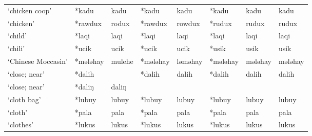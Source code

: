 \begin{landscape}
\begin{longtable}[c]{@{}p{3cm}<{\raggedright}p{2.75cm}<{\raggedright}p{2.75cm}<{\raggedright}p{2.75cm}<{\raggedright}p{2.75cm}<{\raggedright}p{2.75cm}<{\raggedright}p{2.75cm}<{\raggedright}p{2.75cm}<{\raggedright}@{}}
`chicken coop'                                       & *kadu        & kadu                          & *kadu          & kadu                       & *kadu            & kadu                     & kadu                              \\
`chicken'                                            & *rawdux      & rodux                         & *rawdux        & rowdux                     & *rudux           & rudux                    & rudux                             \\
`child'                                              & *laqi        & laqi                          & *laqi          & laqi                       & *laqi            & laqi                     & laqi                              \\
`chili'                                              & *ucik        & ucik                          & *ucik          & ucik                       & *usik            & usik                     & usik                              \\
`Chinese Moccasin'                                   & *mələhay     & mulehe                        & *mələhay       & ləməhay                    & *mələhay         & mələhay                  & mələhay                           \\
`close; near'                                        & *dalih       &                               & *dalih         & dalih                      & *dalih           & dalih                    & dalih                             \\
`close; near'                                        & *daliŋ       & daliŋ                         &                &                            &                  &                          &                                   \\
`cloth bag'                                          & *lubuy       & lubuy                         & *lubuy         & lubuy                      & *lubuy           & lubuy                    & lubuy                             \\
`cloth'                                              & *pala        & pala                          & *pala          & pala                       & *pala            & pala                     & pala                              \\
`clothes'                                            & *lukus       & lukus                         & *lukus         & lukus                      & *lukus           & lukus                    & lukus                             \\

\end{longtable}
\end{landscape}
